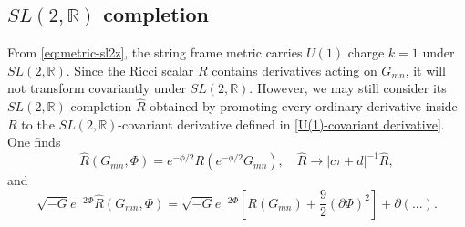 \subsection{\texorpdfstring{$SL(2, \mathbb{R})$}{SL(2, R)} completion}
From \eqref{eq:metric-sl2z}, the string frame metric carries $U(1)$ charge $k=1$ under $SL(2, \mathbb{R})$.
Since the Ricci scalar $R$ contains derivatives acting on $G_{mn}$, it will not transform covariantly under $SL(2, \mathbb{R})$.
However, we may still consider its $SL(2, \mathbb{R})$ completion $\hat{R}$ obtained by promoting every ordinary derivative inside $R$ to the $SL(2, \mathbb{R})$-covariant derivative defined in \eqref{U(1)-covariant derivative}.
One finds
\begin{equation}
\hat{R}(G_{mn},\Phi) = e^{-\phi/2}R(e^{-\phi/2}G_{mn}),\quad
\hat{R} \to |c\tau + d|^{-1}\hat{R},
\end{equation}
and
\begin{equation}
\sqrt{-G}e^{-2\Phi}\hat{R}(G_{mn},\Phi)
=\sqrt{-G}e^{-2\Phi}\left[R(G_{mn})+\frac{9}{2}(\partial\Phi)^2\right]+\partial(...).
\end{equation}

